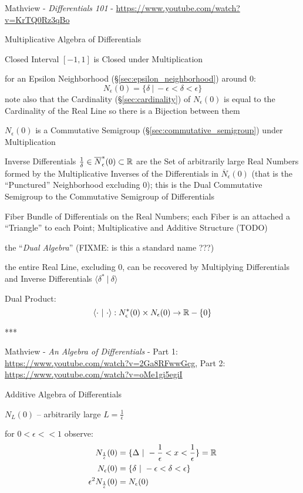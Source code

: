 Mathview - \emph{Differentials 101} -
\url{https://www.youtube.com/watch?v=KrTQ0Rz3qBo}

Multiplicative Algebra of Differentials

Closed Interval $[-1, 1]$ is Closed under Multiplication

for an Epsilon Neighborhood (\S\ref{sec:epsilon_neighborhood}) around $0$:
\[
  N_\epsilon(0) = \{ \delta \ |\ -\epsilon < \delta < \epsilon \}
\]
note also that the Cardinality (\S\ref{sec:cardinality}) of $N_\epsilon(0)$ is
equal to the Cardinality of the Real Line so there is a Bijection between them

$N_\epsilon(0)$ is a Commutative Semigroup (\S\ref{sec:commutative_semigroup})
under Multiplication

Inverse Differentials $\frac{1}{\delta} \in \overline{N}_\epsilon^*(0)
\subset \mathbb{R}$ are the Set of arbitrarily large Real Numbers formed by the
Multiplicative Inverses of the Differentials in $\overline{N}_\epsilon(0)$ (that
is the ``Punctured'' Neighborhood excluding $0$); this is the Dual Commutative
Semigroup to the Commutative Semigroup of Differentials

Fiber Bundle of Differentials on the Real Numbers; each Fiber is an attached a
``Triangle'' to each Point; Multiplicative and Additive Structure (TODO)

the ``\emph{Dual Algebra}''
(FIXME: is this a standard name ???)

the entire Real Line, excluding $0$, can be recovered by Multiplying
Differentials and Inverse Differentials $\langle \delta^* \ |\ \delta \rangle$

Dual Product:
\[
  \langle \cdot \ |\ \cdot\rangle :
    N_\epsilon^*(0) \times N_\epsilon(0) \rightarrow \reals - \{0\}
\]

***

Mathview - \emph{An Algebra of Differentials} -
Part 1: \url{https://www.youtube.com/watch?v=2Ga8RFwwGcg}, Part 2:
\url{https://www.youtube.com/watch?v=oMe1gi5egiI}

Additive Algebra of Differentials

$N_L(0)$ -- arbitrarily large $L = \frac{1}{\epsilon}$

for $0 < \epsilon << 1$ observe:
\begin{align*}
  N_{\frac{1}{\epsilon}}(0) & =
    \{ \Delta \ |\ -\frac{1}{\epsilon} < x < \frac{1}{\epsilon} \} = \mathbb{R} \\
  N_\epsilon(0) & = \{ \delta \ |\ -\epsilon < \delta < \epsilon \} \\
  \epsilon^2 N_{\frac{1}{\epsilon}}(0) & = N_\epsilon(0)
\end{align*}

